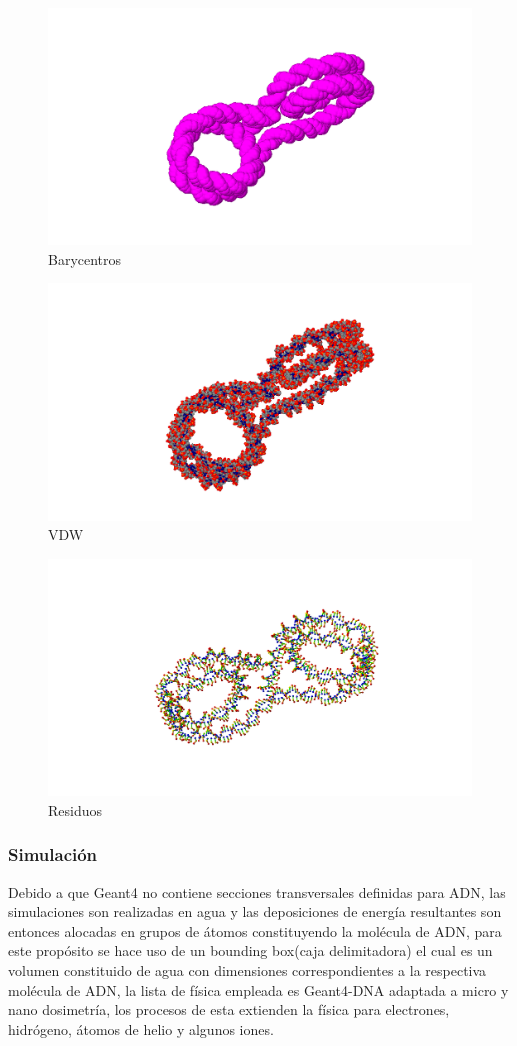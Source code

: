 \begin{figure}[htbp]
    \centering
    \includegraphics[width=.7\linewidth]{./Figures/ba.png}
    \caption{Barycentros}
    \label{fig:ba}
\end{figure}


\begin{figure}[htbp]
    \centering
    \includegraphics[width=.7\linewidth]{./Figures/cpk.png}
    \caption{VDW}
    \label{fig:cpk}
\end{figure}

\begin{figure}[htbp]
    \centering
    \includegraphics[width=.7\linewidth]{./Figures/re.png}
    \caption{Residuos}
    \label{fig:re}
\end{figure}

\subsubsection{Simulación}
Debido a que Geant4 no contiene secciones transversales definidas para ADN, las simulaciones son realizadas en agua y las deposiciones de energía resultantes son entonces alocadas en grupos de átomos constituyendo la molécula de ADN, para este propósito se hace uso de un bounding box(caja delimitadora) el cual es un volumen constituido de agua con dimensiones correspondientes a la respectiva molécula de ADN, la lista de física empleada es Geant4-DNA adaptada a micro y nano dosimetría, los procesos de esta extienden la física para electrones, hidrógeno, átomos de helio y algunos iones\cite{pdblib}.

